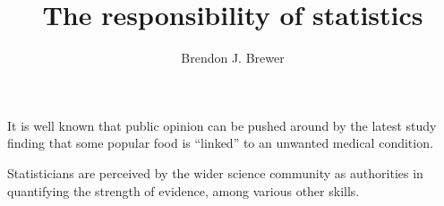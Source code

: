 \documentclass[letterpaper, 11pt]{article}
\title{The responsibility of statistics}
\author{Brendon J. Brewer}
\begin{document}
\maketitle


It is well known that public opinion can be pushed around by the latest study
finding that some popular food is ``linked'' to an unwanted medical condition.


Statisticians are perceived by the wider science community as authorities in
quantifying the strength of evidence, among various other skills.
\end{document}
